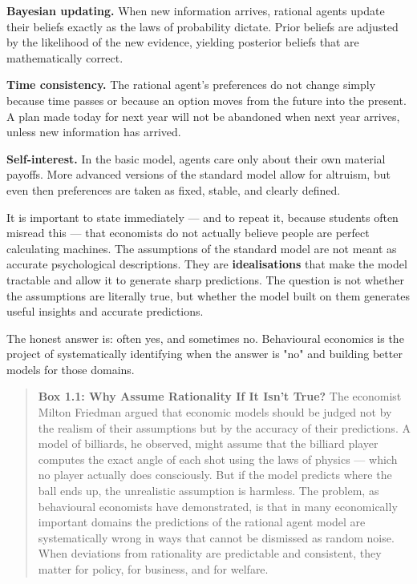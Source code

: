 \documentclass[12pt, letterpaper]{article}
\begin{document}
\textbf{Bayesian updating.} When new information arrives, rational agents update their beliefs exactly as the laws of probability dictate. Prior beliefs are adjusted by the likelihood of the new evidence, yielding posterior beliefs that are mathematically correct.

\textbf{Time consistency.} The rational agent's preferences do not change simply because time passes or because an option moves from the future into the present. A plan made today for next year will not be abandoned when next year arrives, unless new information has arrived.

\textbf{Self-interest.} In the basic model, agents care only about their own material payoffs. More advanced versions of the standard model allow for altruism, but even then preferences are taken as fixed, stable, and clearly defined.

It is important to state immediately --- and to repeat it, because students often misread this --- that economists do not actually believe people are perfect calculating machines. The assumptions of the standard model are not meant as accurate psychological descriptions. They are \textbf{idealisations} that make the model tractable and allow it to generate sharp predictions. The question is not whether the assumptions are literally true, but whether the model built on them generates useful insights and accurate predictions.

The honest answer is: often yes, and sometimes no. Behavioural economics is the project of systematically identifying when the answer is "no" and building better models for those domains.

\begin{quote}
\textbf{Box 1.1: Why Assume Rationality If It Isn't True?}
The economist Milton Friedman argued that economic models should be judged not by the realism of their assumptions but by the accuracy of their predictions. A model of billiards, he observed, might assume that the billiard player computes the exact angle of each shot using the laws of physics --- which no player actually does consciously. But if the model predicts where the ball ends up, the unrealistic assumption is harmless.
The problem, as behavioural economists have demonstrated, is that in many economically important domains the predictions of the rational agent model are systematically wrong in ways that cannot be dismissed as random noise. When deviations from rationality are predictable and consistent, they matter for policy, for business, and for welfare.
\end{quote}
\end{document}
